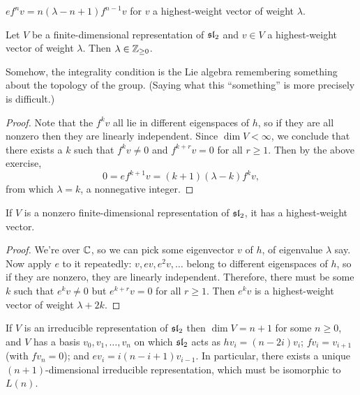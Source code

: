 \begin{exercise}
$ef^nv = n(\lambda - n + 1)f^{n-1}v$ for $v$ a highest-weight vector of weight
$\lambda$.
\end{exercise}

\begin{lemma}
Let $V$ be a finite-dimensional representation of $\sl_2$ and $v \in V$ a
highest-weight vector of weight $\lambda$. Then $\lambda \in \Z_{\geq 0}$.
\end{lemma}

\begin{remark}
Somehow, the integrality condition is the Lie algebra remembering something
about the topology of the group. (Saying what this ``something'' is more
precisely is difficult.)
\end{remark}

\begin{proof}
Note that the $f^kv$ all lie in different eigenspaces of $h$, so if they are
all nonzero then they are linearly independent. Since $\dim V < \infty$, we
conclude that there exists a $k$ such that $f^kv \neq 0$ and $f^{k+r}v = 0$ for
all $r \geq 1$. Then by the above exercise,
\[
  0 = ef^{k+1}v = (k + 1)(\lambda - k)f^kv,
\]
from which $\lambda = k$, a nonnegative integer.
\end{proof}

\begin{proposition}
If $V$ is a nonzero finite-dimensional representation of $\sl_2$, it has a
highest-weight vector.
\end{proposition}

\begin{proof}
We're over $\C$, so we can pick some eigenvector $v$ of $h$, of eigenvalue
$\lambda$ say. Now apply $e$ to it repeatedly: $v, ev, e^2v, \dots$ belong to
different eigenspaces of $h$, so if they are nonzero, they are linearly
independent. Therefore, there must be some $k$ such that $e^kv \neq 0$ but
$e^{k+r}v = 0$ for all $r \geq 1$. Then $e^kv$ is a highest-weight vector of
weight $\lambda + 2k$.
\end{proof}

\begin{corollary}
If $V$ is an irreducible representation of $\sl_2$ then $\dim V = n + 1$ for
some $n \geq 0$, and $V$ has a basis $v_0, v_1, \dots, v_n$ on which $\sl_2$
acts as $hv_i = (n - 2i)v_i$; $fv_i = v_{i+1}$ (with $fv_n = 0$); and
$ev_i = i(n - i + 1)v_{i-1}$. In particular, there exists a unique
$(n+1)$-dimensional irreducible representation, which must be isomorphic to
$L(n)$.
\end{corollary}

